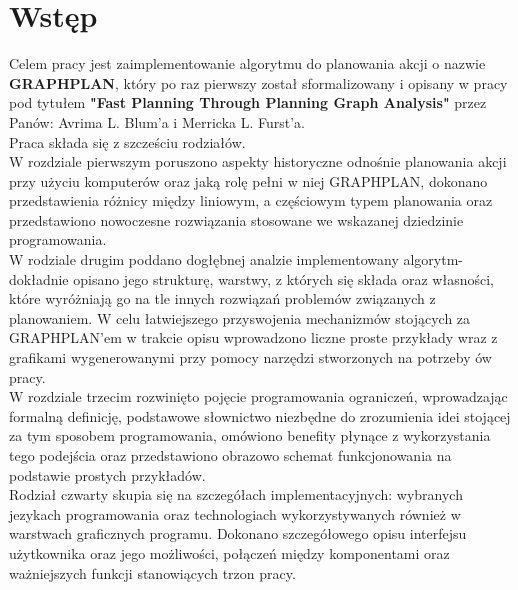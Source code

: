 \chapter*{Wstęp}

\thispagestyle{chapterBeginStyle}

Celem pracy jest zaimplementowanie algorytmu do planowania akcji o nazwie \textbf{GRAPHPLAN}, który po raz pierwszy został sformalizowany i opisany w pracy pod tytułem
\textbf{"Fast Planning Through Planning Graph Analysis"}\cite{GRAPHPLAN} przez Panów: Avrima L. Blum'a i Merricka L. Furst'a.
\\
Praca składa się z szcześciu rodziałów.
\\

	W rozdziale pierwszym poruszono aspekty historyczne odnośnie planowania akcji przy użyciu komputerów oraz jaką rolę pełni w niej GRAPHPLAN,
dokonano przedstawienia różnicy między liniowym, a częściowym typem planowania oraz przedstawiono nowoczesne rozwiązania stosowane we wskazanej dziedzinie programowania.
\\

	W rodziale drugim poddano dogłębnej analzie implementowany algorytm- dokładnie opisano jego strukturę, warstwy, z których się składa oraz własności,
które wyróżniają go na tle innych rozwiązań problemów związanych z planowaniem. W celu łatwiejszego przyswojenia mechanizmów stojących
za GRAPHPLAN'em w trakcie opisu wprowadzono liczne proste przykłady wraz z grafikami wygenerowanymi przy pomocy narzędzi stworzonych
na potrzeby ów pracy.
\\

	W rozdziale trzecim rozwinięto pojęcie programowania ograniczeń, wprowadzając formalną definicję, podstawowe słownictwo niezbędne do 
	zrozumienia idei stojącej za tym sposobem programowania, omówiono benefity płynące z wykorzystania tego podejścia oraz przedstawiono
	obrazowo schemat funkcjonowania na podstawie prostych przykładów.
\\

	Rodział czwarty skupia się na szczegółach implementacyjnych: wybranych jezykach programowania oraz technologiach wykorzystywanych również
w warstwach graficznych programu. Dokonano szczegółowego opisu interfejsu użytkownika oraz jego możliwości, połączeń między komponentami oraz 
ważniejszych funkcji stanowiących trzon pracy.
\\

